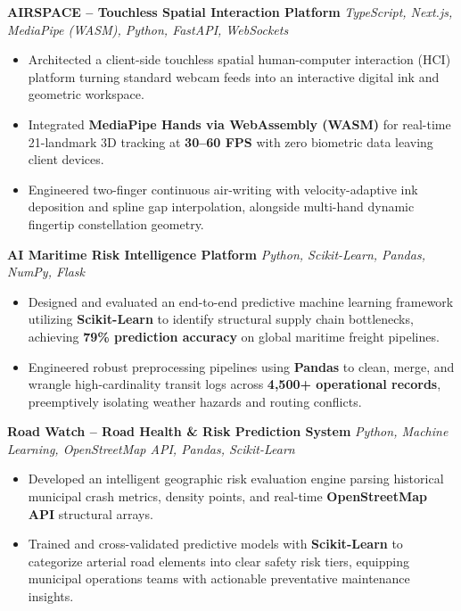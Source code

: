 \documentclass[a4paper,10pt]{article}
\begin{document}
\vspace{2pt}
\textbf{AIRSPACE -- Touchless Spatial Interaction Platform} \hfill \textit{TypeScript, Next.js, MediaPipe (WASM), Python, FastAPI, WebSockets}
\begin{itemize}
    \item Architected a client-side touchless spatial human-computer interaction (HCI) platform turning standard webcam feeds into an interactive digital ink and geometric workspace.
    \item Integrated \textbf{MediaPipe Hands via WebAssembly (WASM)} for real-time 21-landmark 3D tracking at \textbf{30--60 FPS} with zero biometric data leaving client devices.
    \item Engineered two-finger continuous air-writing with velocity-adaptive ink deposition and spline gap interpolation, alongside multi-hand dynamic fingertip constellation geometry.
\end{itemize}

\vspace{2pt}
\textbf{AI Maritime Risk Intelligence Platform} \hfill \textit{Python, Scikit-Learn, Pandas, NumPy, Flask}
\begin{itemize}
    \item Designed and evaluated an end-to-end predictive machine learning framework utilizing \textbf{Scikit-Learn} to identify structural supply chain bottlenecks, achieving \textbf{79\% prediction accuracy} on global maritime freight pipelines.
    \item Engineered robust preprocessing pipelines using \textbf{Pandas} to clean, merge, and wrangle high-cardinality transit logs across \textbf{4,500+ operational records}, preemptively isolating weather hazards and routing conflicts.
\end{itemize}

\vspace{2pt}
\textbf{Road Watch -- Road Health \& Risk Prediction System} \hfill \textit{Python, Machine Learning, OpenStreetMap API, Pandas, Scikit-Learn}
\begin{itemize}
    \item Developed an intelligent geographic risk evaluation engine parsing historical municipal crash metrics, density points, and real-time \textbf{OpenStreetMap API} structural arrays.
    \item Trained and cross-validated predictive models with \textbf{Scikit-Learn} to categorize arterial road elements into clear safety risk tiers, equipping municipal operations teams with actionable preventative maintenance insights.
\end{itemize}
\end{document}
